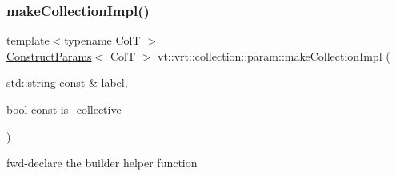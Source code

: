 \subsubsection{\texorpdfstring{make\+Collection\+Impl()}{makeCollectionImpl()}}
{\footnotesize\ttfamily template$<$typename ColT $>$ \\
\hyperlink{structvt_1_1vrt_1_1collection_1_1param_1_1_construct_params}{Construct\+Params}$<$ ColT $>$ vt\+::vrt\+::collection\+::param\+::make\+Collection\+Impl (\begin{DoxyParamCaption}\item[{std\+::string const \&}]{label,  }\item[{bool const}]{is\+\_\+collective }\end{DoxyParamCaption})}



fwd-\/declare the builder helper function 

